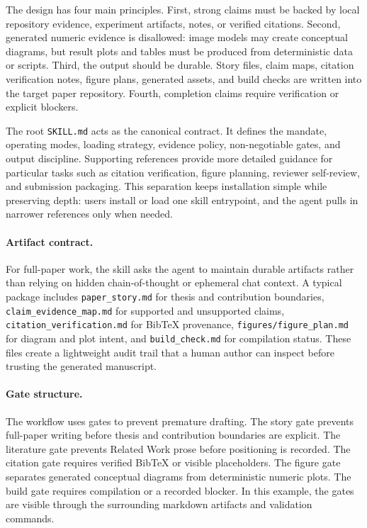 \documentclass{article}
\begin{document}
The design has four main principles. First, strong claims must be backed by local repository evidence, experiment artifacts, notes, or verified citations. Second, generated numeric evidence is disallowed: image models may create conceptual diagrams, but result plots and tables must be produced from deterministic data or scripts. Third, the output should be durable. Story files, claim maps, citation verification notes, figure plans, generated assets, and build checks are written into the target paper repository. Fourth, completion claims require verification or explicit blockers.

The root \texttt{SKILL.md} acts as the canonical contract. It defines the mandate, operating modes, loading strategy, evidence policy, non-negotiable gates, and output discipline. Supporting references provide more detailed guidance for particular tasks such as citation verification, figure planning, reviewer self-review, and submission packaging. This separation keeps installation simple while preserving depth: users install or load one skill entrypoint, and the agent pulls in narrower references only when needed.

\paragraph{Artifact contract.}
For full-paper work, the skill asks the agent to maintain durable artifacts rather than relying on hidden chain-of-thought or ephemeral chat context. A typical package includes \texttt{paper\_story.md} for thesis and contribution boundaries, \texttt{claim\_evidence\_map.md} for supported and unsupported claims, \texttt{citation\_verification.md} for BibTeX provenance, \texttt{figures/figure\_plan.md} for diagram and plot intent, and \texttt{build\_check.md} for compilation status. These files create a lightweight audit trail that a human author can inspect before trusting the generated manuscript.

\paragraph{Gate structure.}
The workflow uses gates to prevent premature drafting. The story gate prevents full-paper writing before thesis and contribution boundaries are explicit. The literature gate prevents Related Work prose before positioning is recorded. The citation gate requires verified BibTeX or visible placeholders. The figure gate separates generated conceptual diagrams from deterministic numeric plots. The build gate requires compilation or a recorded blocker. In this example, the gates are visible through the surrounding markdown artifacts and validation commands.
\end{document}
